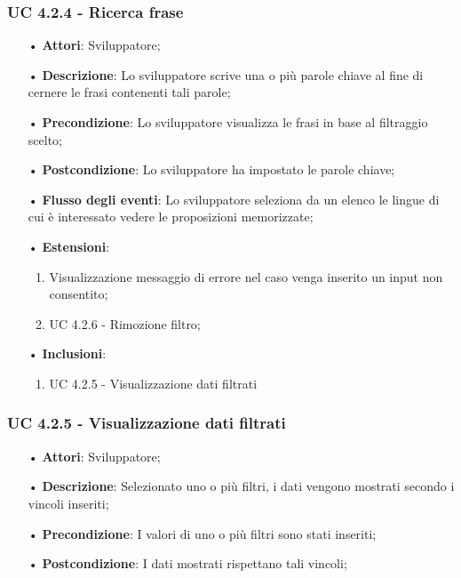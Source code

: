 \subsubsection{UC 4.2.4 - Ricerca frase}
\begin{itemize}
\item[•]\textbf{Attori}: Sviluppatore;
\item[•]\textbf{Descrizione}: Lo sviluppatore scrive una o più parole chiave al fine di cernere le frasi contenenti tali parole;
\item[•]\textbf{Precondizione}: Lo sviluppatore visualizza le frasi in base al filtraggio scelto;
\item[•]\textbf{Postcondizione}: Lo sviluppatore ha impostato le parole chiave;
\item[•]\textbf{Flusso degli eventi}: Lo sviluppatore seleziona da un elenco le lingue di cui è interessato vedere le proposizioni memorizzate;
\item[•]\textbf{Estensioni}: 
\begin{enumerate}
	\item Visualizzazione messaggio di errore nel caso venga inserito un input non consentito;
	\item UC 4.2.6 - Rimozione filtro;
\end{enumerate}
\item[•]\textbf{Inclusioni}:
\begin{enumerate}
\item UC 4.2.5 - Visualizzazione dati filtrati
\end{enumerate}
\end{itemize}

\subsubsection{UC 4.2.5 - Visualizzazione dati filtrati}
\begin{itemize}
\item[•]\textbf{Attori}: Sviluppatore;
\item[•]\textbf{Descrizione}: Selezionato uno o più filtri, i dati vengono mostrati secondo i vincoli inseriti;
\item[•]\textbf{Precondizione}: I valori di uno o più filtri sono stati inseriti;
\item[•]\textbf{Postcondizione}: I dati mostrati rispettano tali vincoli;
\end{itemize}


